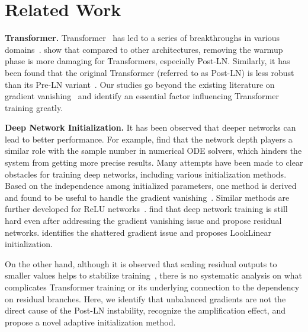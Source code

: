 \documentclass[11pt,a4paper]{article}
\newcommand{\smallsection}[1]{{\vspace{0.2cm}\noindent\textbf{#1.}}}
\begin{document}
\section{Related Work}
\label{sec:related}

\smallsection{Transformer}
Transformer~\cite{Vaswani2017AttentionIA} has led to a series of breakthroughs in various domains~\cite{Devlin2019BERTPO,Velickovic2017GraphAN,Huang2019MusicTG,Parmar2018ImageT,Ramachandran2019StandAloneSI}. 
\citet{Liu2019OnTV} show that compared to other architectures, removing the warmup phase is more damaging for Transformers, especially Post-LN. 
Similarly, it has been found that the original Transformer (referred to as Post-LN) is less robust than its Pre-LN variant~\cite{Baevski2018AdaptiveIR,Nguyen2019TransformersWT,wang-etal-2019-learning}. 
Our studies go beyond the existing literature on gradient vanishing~\cite{Xiong2019OnLN} and identify an essential factor influencing Transformer training greatly. 


\smallsection{Deep Network Initialization} 
It has been observed that deeper networks can lead to better performance. 
For example, \citet{Dong2020TowardsAR} find that the network depth players a similar role with the sample number in numerical ODE solvers, which hinders the system from getting more precise results.
Many attempts have been made to clear obstacles for training deep networks, including various initialization methods.
Based on the independence among initialized parameters, one method is derived and found to be useful to handle the gradient vanishing~\cite{Glorot2010UnderstandingTD}. 
Similar methods are further developed for ReLU networks~\cite{He2015DelvingDI}. 
\citet{He2016DeepRL} find that deep network training is still hard even after addressing the gradient vanishing issue and propose residual networks.
\citet{David2017Shattered} identifies the shattered gradient issue and proposes LookLinear initialization. 


On the other hand, 
although it is observed that scaling residual outputs to smaller values helps to stabilize training~\cite{Hanin2018HowTS,Mishkin2015AllYN,zhang2018residual,Bachlechner2020ReZeroIA,Goyal2017AccurateLM}, there is no systematic analysis on what complicates Transformer training or its underlying connection to the dependency on residual branches.
Here, we identify that unbalanced gradients are not the direct cause of the Post-LN instability, recognize the amplification effect, and propose a novel adaptive initialization method.
 
\end{document}
